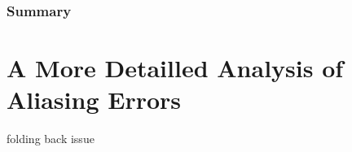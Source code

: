 \subsubsection{Summary}
\label{subsubsec:cic:summary}


\section{A More Detailled Analysis of Aliasing Errors} %
\label{sec:detail_aliasing}

folding back issue


%
%
%
%
%
%
%
%
%
%
%

